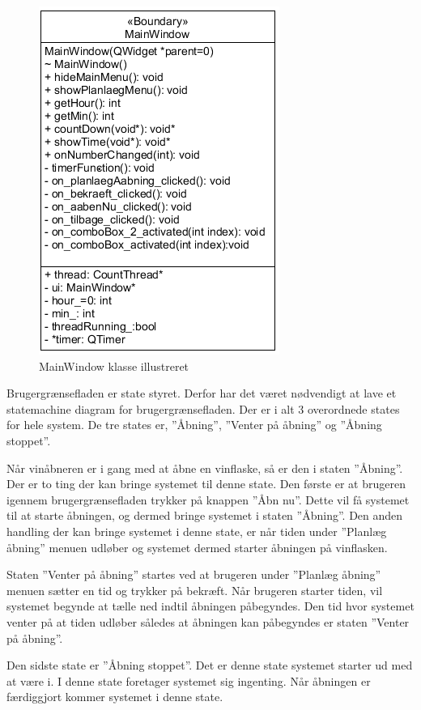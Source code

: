 \begin{figure}[H]
	\centerline{\includegraphics[scale=1]{tex/Design/GUI/Fotos/MainWindow}}
	\caption{MainWindow klasse illustreret}
\end{figure}

Brugergrænsefladen er state styret. Derfor har det været nødvendigt at lave et statemachine diagram for brugergrænsefladen. Der er i alt 3 overordnede states for hele system. De tre states er, ”Åbning”, ”Venter på åbning” og ”Åbning stoppet”.

Når vinåbneren er i gang med at åbne en vinflaske, så er den i staten ”Åbning”. Der er to ting der kan bringe systemet til denne state. Den første er at brugeren igennem brugergrænsefladen trykker på knappen ”Åbn nu”. Dette vil få systemet til at starte åbningen, og dermed bringe systemet i staten ”Åbning”. Den anden handling der kan bringe systemet i denne state, er når tiden under ”Planlæg åbning” menuen udløber og systemet dermed starter åbningen på vinflasken. 

Staten ”Venter på åbning” startes ved at brugeren under ”Planlæg åbning” menuen sætter en tid og trykker på bekræft. Når brugeren starter tiden, vil systemet begynde at tælle ned indtil åbningen påbegyndes. Den tid hvor systemet venter på at tiden udløber således at åbningen kan påbegyndes er staten ”Venter på åbning”.

Den sidste state er ”Åbning stoppet”. Det er denne state systemet starter ud med at være i. I denne state foretager systemet sig ingenting. Når åbningen er færdiggjort kommer systemet i denne state.